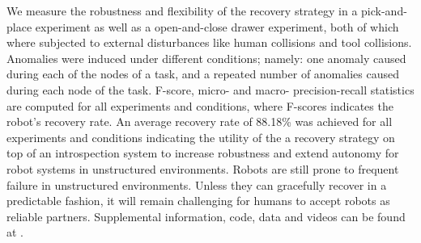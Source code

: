 \documentclass[letterpaper, 10 pt, conference]{ieeeconf}  %
\begin{document}
We measure the robustness and flexibility of the recovery strategy in a pick-and-place experiment as well as a open-and-close drawer experiment, both of which where subjected to external disturbances like human collisions and tool collisions. Anomalies were induced under different conditions; namely: one anomaly caused during each of the nodes of a task, and a repeated number of anomalies caused during each node of the task.
F-score, micro- and macro- precision-recall statistics are computed for all experiments and conditions, where F-scores indicates the robot's recovery rate. An average recovery rate of 88.18\% was achieved for all experiments and conditions indicating the utility of the a recovery strategy on top of an introspection system to increase robustness and extend autonomy for robot systems in unstructured environments.
Robots are still prone to frequent failure in unstructured environments. Unless they can gracefully recover in a predictable fashion, it will remain challenging for humans to accept robots as reliable partners.
Supplemental information, code, data and videos can be found at \cite{2017Humanoids-Rojas-supplementalURL}.
\end{document}

